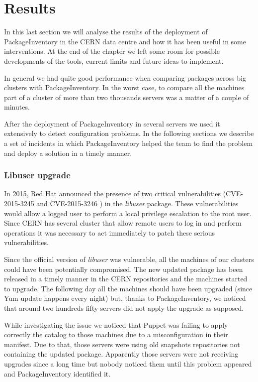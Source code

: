 \section{Results}

In this last section we will analyse the results of the deployment of
PackageInventory in the CERN data centre and how it has been useful in some
interventions. At the end of the chapter we left some room for possible
developments of the tools, current limits and future ideas to implement.

In general we had quite good performance when comparing packages across
big clusters with PackageInventory. In the worst case, to compare all the
machines part of a cluster of more than two thousands servers was a matter of
a couple of minutes.

After the deployment of PackageInventory in several servers we used it
extensively to detect configuration problems. In the following sections we
describe a set of incidents in which PackageInventory helped the team to
find the problem and deploy a solution in a timely manner.

\subsubsection{Libuser upgrade}

In 2015, Red Hat announced the presence of two critical vulnerabilities
(CVE-2015-3245 \cite{cve-2015-3245} and CVE-2015-3246
\cite{cve-2015-3246}) in the \textit{libuser} package. These
vulnerabilities would allow a logged user to perform a local privilege
escalation to the root user. Since CERN has several cluster that allow
remote users to log in and perform operations it was necessary to act
immediately to patch these serious vulnerabilities.

Since the official version of \textit{libuser} was vulnerable, all the
machines of our clusters could have been potentially compromised. The
new updated package has been released in a timely manner in the CERN
repositories and the machines started to upgrade. The following day all
the machines should have been upgraded (since Yum update happens every
night) but, thanks to PackageInventory, we noticed that around two
hundreds fifty servers did not apply the upgrade as supposed.

While investigating the issue we noticed that Puppet was failing to apply
correctly the catalog to those machines due to a misconfiguration in their
manifest. Due to that, those servers were using old snapshots repositories
not containing the updated package. Apparently those servers were not
receiving upgrades since a long time but nobody noticed them until this
problem appeared and PackageInventory identified it.

